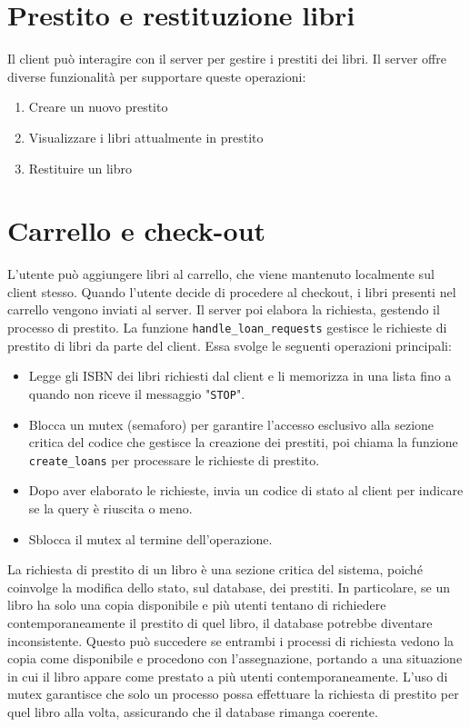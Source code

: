 \documentclass[]{report}
\begin{document}
\section{Prestito e restituzione libri}
Il client può interagire con il server per gestire i prestiti dei libri. Il server offre diverse funzionalità per supportare queste operazioni:
\begin{enumerate}
	\item Creare un nuovo prestito
	\item Visualizzare i libri attualmente in prestito
	\item Restituire un libro
\end{enumerate}

\section{Carrello e check-out}
L'utente può aggiungere libri al carrello, che viene mantenuto localmente sul client stesso. Quando l'utente decide di procedere al checkout, i libri presenti nel carrello vengono inviati al server. Il server poi elabora la richiesta, gestendo il processo di prestito.\meskip
La funzione \texttt{handle\_loan\_requests} gestisce le richieste di prestito di libri da parte del client. Essa svolge le seguenti operazioni principali:
\begin{itemize}
	\item Legge gli ISBN dei libri richiesti dal client e li memorizza in una lista fino a quando non riceve il messaggio "\texttt{STOP}".
	\item Blocca un mutex (semaforo) per garantire l'accesso esclusivo alla sezione critica del codice che gestisce la creazione dei prestiti, poi chiama la funzione \texttt{create\_loans} per processare le richieste di prestito.
	\item Dopo aver elaborato le richieste, invia un codice di stato al client per indicare se la query è riuscita o meno.
	\item Sblocca il mutex al termine dell'operazione.
\end{itemize}\medskip
La richiesta di prestito di un libro è una sezione critica del sistema, poiché coinvolge la modifica dello stato, sul database, dei prestiti. In particolare, se un libro ha solo una copia disponibile e più utenti tentano di richiedere contemporaneamente il prestito di quel libro, il database potrebbe diventare inconsistente. Questo può succedere se entrambi i processi di richiesta vedono la copia come disponibile e procedono con l'assegnazione, portando a una situazione in cui il libro appare come prestato a più utenti contemporaneamente. L'uso di mutex garantisce che solo un processo possa effettuare la richiesta di prestito per quel libro alla volta, assicurando che il database rimanga coerente.
\end{document}

